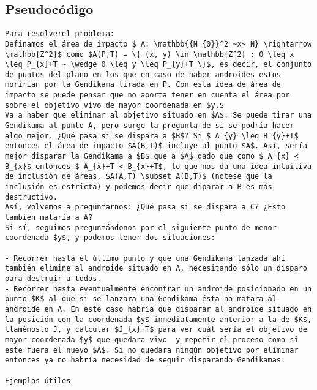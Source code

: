 \documentclass[10pt,a4paper]{article}
\begin{document}
\subsection{Pseudocódigo}
\begin{verbatim}
Para resolverel problema:
Definamos el área de impacto $ A: \mathbb{{N_{0}}^2 ~x~ N} \rightarrow \mathbb{Z^2}$ como $A(P,T) = \{ (x, y) \in \mathbb{Z^2} : 0 \leq x \leq P_{x}+T ~ \wedge 0 \leq y \leq P_{y}+T \}$, es decir, el conjunto de puntos del plano en los que en caso de haber androides estos morirían por la Gendikama tirada en P. Con esta idea de área de impacto se puede pensar que no aporta tener en cuenta el área por sobre el objetivo vivo de mayor coordenada en $y.$
Va a haber que eliminar al objetivo situado en $A$. Se puede tirar una Gendikama al punto A, pero surge la pregunta de si se podría hacer algo mejor. ¿Qué pasa si se dispara a $B$? Si $ A_{y} \leq B_{y}+T$ entonces el área de impacto $A(B,T)$ incluye al punto $A$. Así, sería mejor disparar la Gendikama a $B$ que a $A$ dado que como $ A_{x} < B_{x}$ entonces $ A_{x}+T < B_{x}+T$, lo que nos da una idea intuitiva de inclusión de áreas, $A(A,T) \subset A(B,T)$ (nótese que la inclusión es estricta) y podemos decir que diparar a B es más destructivo.
Así, volvemos a preguntarnos: ¿Qué pasa si se dispara a C? ¿Esto también mataría a A?
Si sí, seguimos preguntándonos por el siguiente punto de menor coordenada $y$, y podemos tener dos situaciones:

- Recorrer hasta el último punto y que una Gendikama lanzada ahí también elimine al androide situado en A, necesitando sólo un disparo para destruir a todos.
- Recorrer hasta eventualmente encontrar un androide posicionado en un punto $K$ al que si se lanzara una Gendikama ésta no matara al androide en A. En este caso habría que disparar al androide situado en la posición con la coordenada $y$ inmediatamente anterior a la de $K$, llamémoslo J, y calcular $J_{x}+T$ para ver cuál sería el objetivo de mayor coordenada $y$ que quedara vivo  y repetir el proceso como si este fuera el nuevo $A$. Si no quedara ningún objetivo por eliminar entonces ya no habría necesidad de seguir disparando Gendikamas.

Ejemplos útiles


\end{verbatim}
\end{document}
